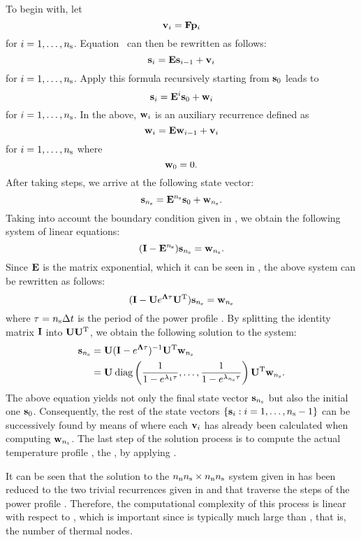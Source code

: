 To begin with, let
\[
  \mathbf{v}_i = \mathbf{F} \mathbf{p}_i
\]
for $i = 1, \dots, {n_\mathrm{s}}$. Equation~ can then be rewritten as
follows:
\begin{equation} \elab{steady-state-recurrence}
  \vs_i = \m{E} \vs_{i - 1} + \v{v}_i
\end{equation}
for $i = 1, \dots, {n_\mathrm{s}}$. Apply this formula recursively starting from $\mathbf{s}_0$
leads to
\[
  \mathbf{s}_i = \mathbf{E}^i \mathbf{s}_0 + \mathbf{w}_i
\]
for $i = 1, \dots, {n_\mathrm{s}}$. In the above, $\mathbf{w}_i$ is an auxiliary recurrence
defined as
\begin{equation} \elab{steady-state-auxiliary-recurrence}
  \v{w}_i = \m{E} \v{w}_{i - 1} + \v{v}_i
\end{equation}
for $i = 1, \dots, {n_\mathrm{s}}$ where
\[
  \mathbf{w}_0 = 0.
\]
After taking \ns steps, we arrive at the following state vector:
\[
  \mathbf{s}_{n_\mathrm{s}} = \mathbf{E}^{n_\mathrm{s}} \mathbf{s}_0 + \mathbf{w}_{n_\mathrm{s}}.
\]
Taking into account the boundary condition given in ,
we obtain the following system of linear equations:
\[
  (\mathbf{I} - \mathbf{E}^{n_\mathrm{s}}) \mathbf{s}_{n_\mathrm{s}} = \mathbf{w}_{n_\mathrm{s}}.
\]
Since $\mathbf{E}$ is the matrix exponential, which it can be seen in
, the above system can be rewritten as follows:
\[
  (\mathbf{I} - \mathbf{U} e^{\mathbf{\Lambda} \tau} {\mathbf{U}}^\mathrm{T}) \mathbf{s}_{n_\mathrm{s}} = \mathbf{w}_{n_\mathrm{s}}
\]
where $\tau = {n_\mathrm{s}} \Delta t$ is the period of the power profile \mp. By splitting the
identity matrix $\mathbf{I}$ into $\mathbf{U} {\mathbf{U}}^\mathrm{T}$, we obtain the following
solution to the system:
\begin{align}
  \vs_\ns
  & = \m{U} (\m{I} - e^{\m{\Lambda} \tau})^{-1} \transpose{\m{U}} \v{w}_\ns \elab{t0} \\
  & = \m{U} \: \diagonal{\frac{1}{1 - e^{\lambda_1 \tau}}}{\frac{1}{1 - e^{\lambda_\ns \tau}}} \transpose{\m{U}} \v{w}_\ns. \nonumber
\end{align}
The above equation yields not only the final state vector $\mathbf{s}_{n_\mathrm{s}}$ but also the
initial one $\mathbf{s}_0$. Consequently, the rest of the state vectors $\{ \mathbf{s}_i: i =
1, \dots, {n_\mathrm{s}} - 1 \}$ can be successively found by means of
 where each $\mathbf{v}_i$ has already been calculated
when computing $\mathbf{w}_{n_\mathrm{s}}$. The last step of the solution process is to compute
the actual temperature profile \mq, the , by applying
.

It can be seen that the solution to the ${n_\mathrm{n}} {n_\mathrm{s}} \times {n_\mathrm{n}} {n_\mathrm{s}}$ system given in
 has been reduced to the two trivial recurrences given
in  and 
that traverse the \ns steps of the power profile \mp. Therefore, the
computational complexity of this process is linear with respect to \ns, which is
important since \ns is typically much large than \nn, that is, the number of
thermal nodes.

